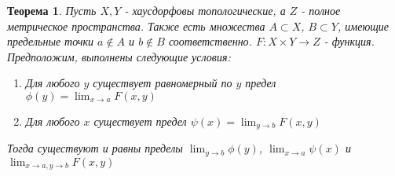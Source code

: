 \documentclass[a4paper]{article}
\theoremstyle{indented}
\newtheorem{theorem}{Теорема}
\theoremstyle{definition}
\theoremstyle{remark}
\DeclareMathOperator{\ra}{\rightarrow}
\begin{document}
\begin{theorem}
    Пусть $X, Y$ - хаусдорфовы топологические, а $Z$ - полное метрическое пространства. Также есть множества $A \subset X$, $B \subset Y$, имеющие предельные точки $a \notin A$ и $b \notin B$ соответственно. $F: X \times Y \ra Z$ - функция. Предположим, выполнены следующие условия:
    \begin{enumerate}
        \item Для любого $y$ существует равномерный по $y$ предел $\phi(y)=\lim_{x \ra a} F(x, y)$
        \item Для любого $x$ существует предел $\psi(x)=\lim_{y \ra b} F(x, y)$
    \end{enumerate}
    Тогда существуют и равны пределы $\lim_{y \ra b}\phi(y)$, $\lim_{x \ra a} \psi(x)$ и $\lim_{x \ra a, y \ra b} F(x, y)$
\end{theorem}
\end{document}
